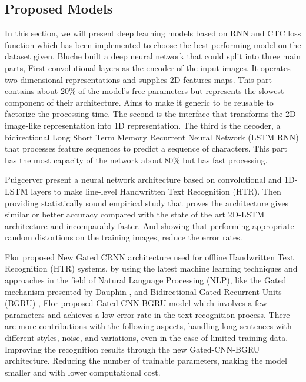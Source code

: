 \documentclass[preprint,12pt]{elsarticle}
\begin{document}
\subsection{Proposed Models}
In this section, we will present deep learning models based on RNN and CTC loss function which has been implemented to choose the best performing model on the dataset given. Bluche \cite{bluche2017gated} built a deep neural network that could split into three main parts, First convolutional layers as the encoder of the input images. It operates two-dimensional representations and supplies 2D features maps. This part contains about 20\% of the model’s free parameters but represents the slowest component of their architecture. Aims to make it generic to be reusable to factorize the processing time. The second is the interface that transforms the 2D image-like representation into 1D representation. The third is the decoder, a bidirectional Long Short Term Memory Recurrent Neural Network (LSTM RNN) that processes feature sequences to predict a sequence of characters. This part has the most capacity of the network about 80\% but has fast processing.

Puigcerver \cite{puigcerver2017multidimensional} present a neural network architecture based on convolutional and 1D-LSTM layers to make line-level Handwritten Text Recognition (HTR). Then providing statistically sound empirical study that proves the architecture gives similar or better accuracy compared with the state of the art 2D-LSTM architecture and incomparably faster. And showing that performing appropriate random distortions on the training images, reduce the error rates. 

Flor\cite{de2020htr} proposed New Gated CRNN architecture used for offline Handwritten Text Recognition (HTR) systems, by using the latest machine learning techniques and approaches in the field of Natural Language Processing (NLP), like the Gated mechanism presented by Dauphin \cite{dauphin2017language}, and Bidirectional Gated Recurrent Units (BGRU) \cite{cho2014learning}, Flor proposed Gated-CNN-BGRU model which involves a few parameters and achieves a low error rate in the text recognition process. There are more contributions with the following aspects, handling long sentences with different styles, noise, and variations, even in the case of limited training data. Improving the recognition results through the new Gated-CNN-BGRU architecture. Reducing the number of trainable parameters, making the model smaller and with lower computational cost.
\end{document}
